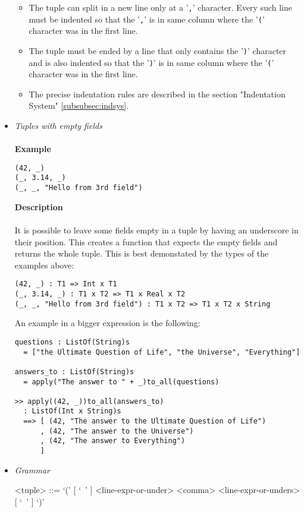 \documentclass{article}
\begin{document}
\begin{itemize}
\begin{itemize}
\item
The tuple can split in a new line only at a '\verb|,|' character. Every such
line must be indented so that the '\verb|,|' is in same column where the
'\verb|(|' character was in the first line.

\item
The tuple must be ended by a line that only contains the '\verb|)|' character
and is also indented so that the '\verb|)|' is in same column where the
'\verb|(|' character was in the first line.

\item
The precise indentation rules are described in the section
"Indentation System" \ref{subsubsec:indsys}.
\end{itemize}

\item \textit{Tuples with empty fields}
\\\\
\textbf{Example}
\begin{verbatim}
(42, _)
(_, 3.14, _)
(_, _, "Hello from 3rd field")
\end{verbatim}

\textbf{Description}\\\\
It is possible to leave some fields empty in a tuple by having an underscore in
their position. This creates a function that expects the empty fields
and returns the whole tuple. This is best demonstated by the types of the
examples above:
\begin{verbatim}
(42, _) : T1 => Int x T1
(_, 3.14, _) : T1 x T2 => T1 x Real x T2
(_, _, "Hello from 3rd field") : T1 x T2 => T1 x T2 x String
\end{verbatim}
An example in a bigger expression is the following:
\begin{verbatim}
questions : ListOf(String)s
  = ["the Ultimate Question of Life", "the Universe", "Everything"]

answers_to : ListOf(String)s
  = apply("The answer to " + _)to_all(questions)

>> apply((42, _))to_all(answers_to)
  : ListOf(Int x String)s
  ==> [ (42, "The answer to the Ultimate Question of Life")
      , (42, "The answer to the Universe")
      , (42, "The answer to Everything")
      ]
\end{verbatim}

\item \textit{Grammar}
\begin{grammar}
<tuple> ::=
`(' [ `\ ' ] <line-expr-or-under> <comma> <line-expr-or-unders> [ `\ ' ] `)'


\end{grammar}
\end{itemize}
\end{document}
